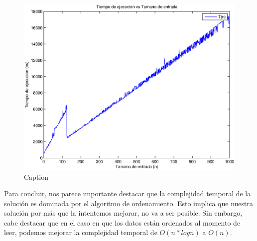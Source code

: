 \begin{figure}
  \begin{center}
    \includegraphics[scale=0.5]{problema1/graficos/problema1_aleatoria_1000.eps}
  \end{center}
  \caption{Caption}
  \label{fig:}
\end{figure}

Para concluir, nos parece importante destacar que la complejidad temporal de la solución es dominada por el algoritmo de ordenamiento. Esto implica que nuestra solución por más que la intentemos mejorar, no va a ser posible. Sin embargo, cabe destacar que en el caso en que los datos están ordenados al momento de leer, podemos mejorar la complejidad temporal de $O(n * log n)$ a $O(n)$.